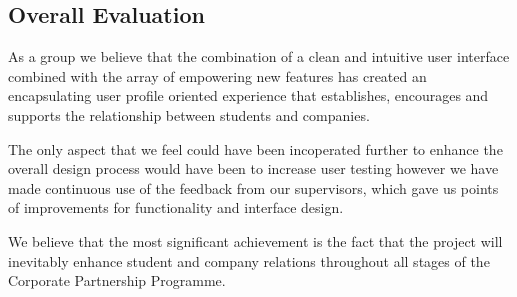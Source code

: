\subsection{Overall Evaluation}
  As a group we believe that the combination of a clean and intuitive user interface combined with the array of empowering new features has created an encapsulating user profile oriented experience that establishes, encourages and supports the relationship between students and companies.

  The only aspect that we feel could have been incoperated further to enhance the overall design process would have been to increase user testing however we have made continuous use of the feedback from our supervisors, which gave us points of improvements for functionality and interface design.
  
  We believe that the most significant achievement is the fact that the project will inevitably enhance student and company relations throughout all stages of the Corporate Partnership Programme.
